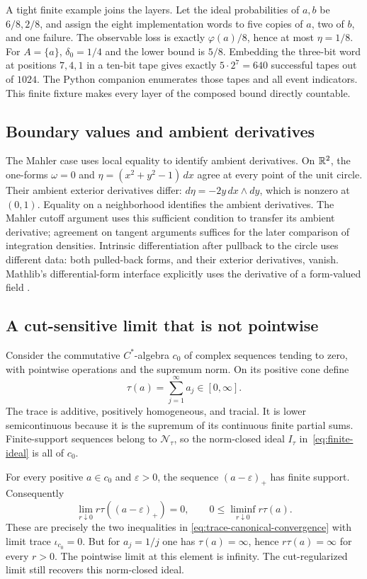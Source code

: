 A tight finite example joins the layers. Let the ideal probabilities of
$a,b$ be $6/8,2/8$, and assign the eight implementation words to five
copies of $a$, two of $b$, and one failure. The observable loss is exactly
$\varphi(a)/8$, hence at most $\eta=1/8$. For $A=\{a\}$,
$\delta_0=1/4$ and the lower bound is $5/8$. Embedding the three-bit word
at positions $7,4,1$ in a ten-bit tape gives exactly
$5\cdot2^7=640$ successful tapes out of $1024$. The Python companion
enumerates those tapes and all event indicators. This finite fixture makes every layer of the composed bound directly countable.

\subsection{Boundary values and ambient derivatives}
\label{sec:local-forms}

The Mahler case uses local equality to identify ambient derivatives.
On $\mathbb R^2$, the
one-forms $\omega=0$ and $\eta=(x^2+y^2-1)\,dx$ agree at every point
of the unit circle. Their ambient exterior derivatives differ:
$d\eta=-2y\,dx\wedge dy$, which is nonzero at $(0,1)$.
Equality on a neighborhood identifies the ambient derivatives.
The Mahler cutoff argument uses this sufficient condition to transfer
its ambient derivative; agreement on tangent arguments suffices for the
later comparison of integration densities. Intrinsic differentiation
after pullback to the circle uses different data: both pulled-back forms,
and their exterior derivatives, vanish. Mathlib's
differential-form interface explicitly uses the derivative of a
form-valued field \citep{MathlibForms}.


\subsection{A cut-sensitive limit that is not pointwise}
\label{sec:trace-example}

Consider the commutative $C^*$-algebra $c_0$ of complex sequences tending
to zero, with pointwise operations and the supremum norm. On its positive
cone define
\[
  \tau(a)=\sum_{j=1}^{\infty}a_j\in[0,\infty].
\]
The trace is additive, positively homogeneous, and tracial. It is lower
semicontinuous because it is the supremum of its continuous finite partial
sums. Finite-support sequences belong to $\mathcal N_\tau$, so the
norm-closed ideal $I_\tau$ in~\eqref{eq:finite-ideal} is all of $c_0$.

For every positive $a\in c_0$ and $\varepsilon>0$, the sequence
$(a-\varepsilon)_+$ has finite support. Consequently
\[
  \lim_{r\downarrow0}r\tau((a-\varepsilon)_+)=0,
  \qquad 0\leq\liminf_{r\downarrow0}r\tau(a).
\]
These are precisely the two inequalities in
\eqref{eq:trace-canonical-convergence} with limit trace
$\iota_{c_0}=0$. But for $a_j=1/j$ one has $\tau(a)=\infty$, hence
$r\tau(a)=\infty$ for every $r>0$. The pointwise limit at this element
is infinity. The cut-regularized limit still recovers this norm-closed ideal.

